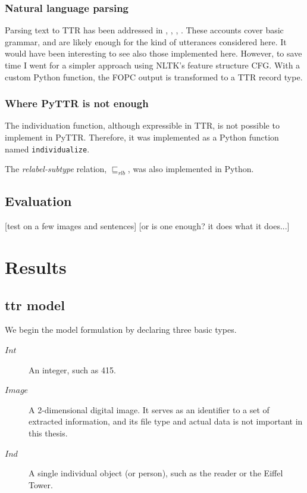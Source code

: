 \documentclass[11pt, a4paper]{article}
\begin{document}
\subsubsection{Natural language parsing}

Parsing text to TTR has been addressed in \cite{CooperRecordsRecordTypes2005}, \cite{RobinCooperAustiniantruthattitudes2005}, \cite{CooperTypetheorysemantics2012}, \cite{CooperTypetheorylanguage2016}.
These accounts cover basic grammar, and are likely enough for the kind of utterances considered here.
It would have been interesting to see also those implemented here.
However, to save time I went for a simpler approach using NLTK's feature structure CFG.
With a custom Python function, the FOPC output is transformed to a TTR record type.



\subsubsection{Where PyTTR is not enough}

The individuation function, although expressible in TTR, is not possible to implement in PyTTR.
Therefore, it was implemented as a Python function named {\tt individualize}.

The \textit{relabel-subtype} relation, $\sqsubseteq_{rlb}$, was also implemented in Python.



\subsection{Evaluation}

[test on a few images and sentences] [or is one enough? it does what it does...]



\section{Results}
\label{sec:results}



\subsection{\Gls{ttr} model}

We begin the model formulation by declaring three basic types.

\begin{description}
\item [$Int$] An integer, such as 415.
\item [$Image$] A 2-dimensional digital image. It serves as an identifier to a set of extracted information, and its file type and actual data is not important in this thesis.
\item [$Ind$] A single individual object (or person), such as the reader or the Eiffel Tower.
\end{description}
\end{document}
